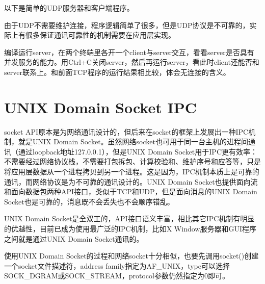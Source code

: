 

以下是简单的UDP服务器和客户端程序。





由于UDP不需要维护连接，程序逻辑简单了很多，但是UDP协议是不可靠的，实际上有很多保证通讯可靠性的机制需要在应用层实现。



编译运行server，在两个终端里各开一个client与server交互，看看server是否具有并发服务的能力。用Ctrl+\BookSplit{}C关闭server，然后再运行server，看此时client还能否和server联系上。和前面TCP程序的运行结果相比较，体会无连接的含义。




\section{UNIX Domain Socket IPC}
%
socket API原本是为网络通讯设计的，但后来在socket的框架上发展出一种IPC机制，就是UNIX Domain Socket。虽然网络socket也可用于同一台主机的进程间通讯（通过loopback地址127.\BookSplit{}0.\BookSplit{}0.\BookSplit{}1），但是UNIX Domain Socket用于IPC更有效率：不需要经过网络协议栈，不需要打包拆包、计算校验和、维护序号和应答等，只是将应用层数据从一个进程拷贝到另一个进程。这是因为，IPC机制本质上是可靠的通讯，而网络协议是为不可靠的通讯设计的。UNIX Domain Socket也提供面向流和面向数据包两种API接口，类似于TCP和UDP，但是面向消息的UNIX Domain Socket也是可靠的，消息既不会丢失也不会顺序错乱。



UNIX Domain Socket是全双工的，API接口语义丰富，相比其它IPC机制有明显的优越性，目前已成为使用最广泛的IPC机制，比如X Window服务器和GUI程序之间就是通过UNIX Domain Socket通讯的。



使用UNIX Domain Socket的过程和网络socket十分相似，也要先调用socket()创建一个socket文件描述符，address family指定为AF\_\BookSplit{}UNIX，type可以选择SOCK\_\BookSplit{}DGRAM或SOCK\_\BookSplit{}STREAM，protocol参数仍然指定为0即可。



